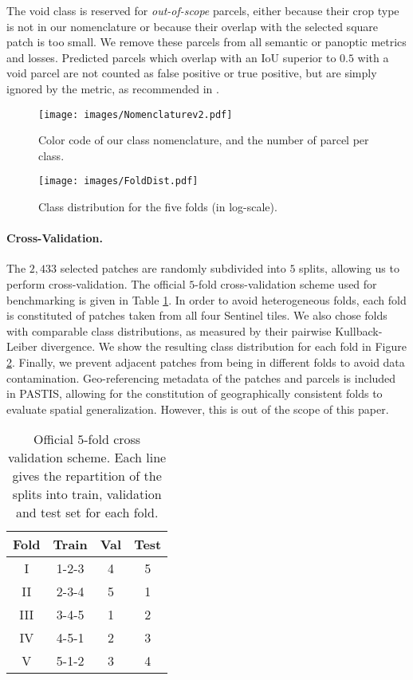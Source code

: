 The void class is reserved for \emph{out-of-scope} parcels, either because their crop type is not in our nomenclature or because their overlap with the selected square patch is too small. We remove these parcels from all semantic or panoptic metrics and losses. Predicted parcels which overlap with an IoU superior to $0.5$ with a void parcel are not counted as false positive or true positive, but are simply ignored by the metric, as recommended in \cite{kirillov2019panoptic}.

\begin{figure}
    \centering
    \texttt{[image: images/Nomenclaturev2.pdf]}
    \caption{Color code of our class nomenclature, and the number of parcel per class.}
    \label{fig:nomenc}
\end{figure}



\begin{figure}[ht!]
    \centering
    \texttt{[image: images/FoldDist.pdf]}
    \caption{Class distribution for the five folds (in log-scale).}
    \label{fig:class_counts}
\end{figure}

\paragraph{Cross-Validation.} The $2,433$ selected patches are randomly subdivided into $5$ splits, allowing us to perform cross-validation. The official $5$-fold cross-validation scheme used for benchmarking is given in Table \ref{tab:cv}.
In order to avoid heterogeneous folds, 
each fold is constituted of patches taken from all four Sentinel tiles.
We also chose folds with comparable class distributions, as measured by their pairwise Kullback-Leiber divergence. We show the resulting class distribution for each fold in Figure \ref{fig:class_counts}. 
Finally, we prevent adjacent patches from being in different folds to avoid data contamination.
Geo-referencing metadata of the patches and parcels is included in PASTIS, allowing for the constitution of geographically consistent folds to evaluate spatial generalization. However, this is out of the scope of this paper.
\begin{table}[h]
    \centering
    \begin{tabular}{c|ccc}
       Fold  & Train & Val & Test  \\\midrule
        I &1-2-3 & 4 & 5\\
        II &2-3-4 & 5 & 1\\
        III &3-4-5 & 1 & 2\\
        IV &4-5-1 & 2 & 3\\
        V &5-1-2 & 3 & 4\\    \end{tabular}
    \caption{Official $5$-fold cross validation scheme. Each line gives the repartition of the splits into train, validation and test set for each fold. }
    \label{tab:cv}
\end{table}


